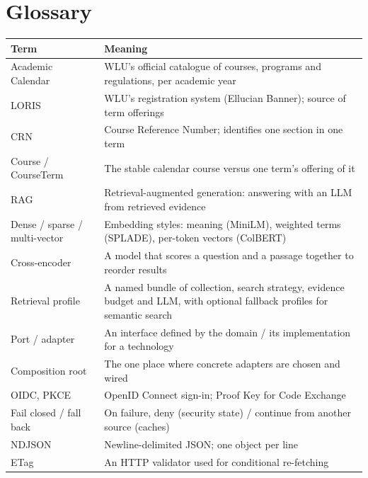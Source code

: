 \documentclass[11pt,letterpaper]{report}
\begin{document}
\appendix
\chapter{Glossary}
\begin{longtable}{@{}P{4.0cm}P{11.4cm}@{}}
\toprule
\textbf{Term} & \textbf{Meaning} \\
\midrule
\endhead
Academic Calendar & WLU's official catalogue of courses, programs and regulations, per academic year \\
LORIS & WLU's registration system (Ellucian Banner); source of term offerings \\
CRN & Course Reference Number; identifies one section in one term \\
Course / CourseTerm & The stable calendar course versus one term's offering of it \\
RAG & Retrieval-augmented generation: answering with an LLM from retrieved evidence \\
Dense / sparse / multi-vector & Embedding styles: meaning (MiniLM), weighted terms (SPLADE), per-token vectors (ColBERT) \\
Cross-encoder & A model that scores a question and a passage together to reorder results \\
Retrieval profile & A named bundle of collection, search strategy, evidence budget and LLM, with optional fallback profiles for semantic search \\
Port / adapter & An interface defined by the domain / its implementation for a technology \\
Composition root & The one place where concrete adapters are chosen and wired \\
OIDC, PKCE & OpenID Connect sign-in; Proof Key for Code Exchange \\
Fail closed / fall back & On failure, deny (security state) / continue from another source (caches) \\
NDJSON & Newline-delimited JSON; one object per line \\
ETag & An HTTP validator used for conditional re-fetching \\
\bottomrule
\end{longtable}
\end{document}
